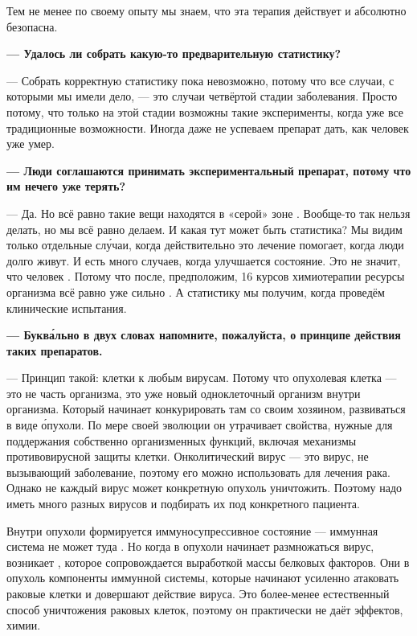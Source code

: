 Тем не менее по своему опыту мы знаем, что эта терапия действует и абсолютно безопасна.

{\bf --- Удалось ли собрать какую-то предварительную статистику?}

--- Собрать корректную статистику пока невозможно, потому что все случаи, с которыми мы имели дело, --- это случаи четвёртой стадии заболевания. Просто потому, что только на этой стадии возможны такие эксперименты, когда уже  все традиционные возможности. Иногда даже не успеваем препарат дать, как человек уже умер.

{\bf --- Люди соглашаются принимать экспериментальный препарат, потому что им нечего уже терять?}

--- Да. Но всё равно такие вещи находятся в «серой» зоне . Вообще-то так нельзя делать, но мы всё равно делаем. И какая тут может быть статистика? Мы видим только отдельные сл\'{у}чаи, когда действительно это лечение помогает, когда люди долго живут. И есть много случаев, когда улучшается состояние. Это не значит, что человек . Потому что после, предположим, 16 курсов химиотерапии ресурсы организма всё равно уже сильно . А статистику мы получим, когда проведём клинические испытания.

{\bf --- Букв\'{а}льно в двух словах напомните, пожалуйста, о принципе действия таких препаратов.}

--- Принцип такой:  клетки  к любым вирусам. Потому что опухолевая клетка --- это не часть организма, это уже новый одноклеточный организм внутри организма. Который начинает конкурировать там со своим хозяином, развиваться в виде \'{о}пухоли. По мере своей эволюции он утрачивает свойства, нужные для поддержания собственно организменных функций, включая механизмы противовирусной защиты клетки. Онколитический вирус --- это вирус, не вызывающий заболевание, поэтому его можно использовать для лечения рака. Однако не каждый вирус может конкретную опухоль уничтожить. Поэтому надо иметь много разных вирусов и подбирать их под конкретного пациента.

Внутри опухоли формируется иммуносупрессивное состояние --- иммунная система не может туда . Но когда в опухоли начинает размножаться вирус, возникает , которое сопровождается выработкой массы белковых факторов. Они  в опухоль компоненты иммунной системы, которые начинают усиленно атаковать раковые клетки и довершают действие вируса. Это более-менее естественный способ уничтожения раковых клеток, поэтому он практически не даёт  эффектов,  химии.

